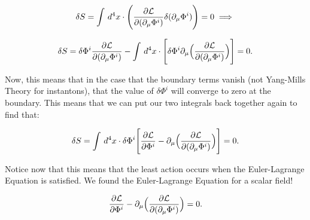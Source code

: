 \documentclass{article}
\newcommand{\lagr}{\mathcal{L}}
\newcommand{\phim}{\Phi^{i}}
\newcommand{\elpot}{\pdv{\lagr}{\phim}}
\newcommand{\pmu}[1]{\partial_{#1}}
\newcommand{\elmom}{\pdv{\lagr}{(\pmu{\mu}\phim)}}
\begin{document}
\[
    \delta S = \int \,d^4 x \cdot \Bigg(\elmom \delta (\pmu{\mu}\phim) \Bigg) = 0 \implies
\] 

\[
    \delta S = \delta\phim \elmom - \int \,d^4 x \cdot \Bigg[\delta\phim \pmu{\mu}\Big( \elmom \Big) \Bigg] = 0
.\] 

Now, this means that in the case that the boundary terms vanish (not Yang-Mills Theory for instantons), that the value of $\delta\phim$ will converge to zero at the boundary. This means that we can put our two integrals back together again to find that:

\[
\delta S = \int \,d^4 x \cdot \delta\phim \Bigg[\elpot - \pmu{\mu}\Big( \elmom \Big) \Bigg] = 0
.\] 

Notice now that this means that the least action occurs when the Euler-Lagrange Equation is satisfied. We found the Euler-Lagrange Equation for a scalar field!

\begin{equation}
    \elpot - \pmu{\mu}\Big(\elmom \Big) = 0.
\end{equation}
\end{document}
